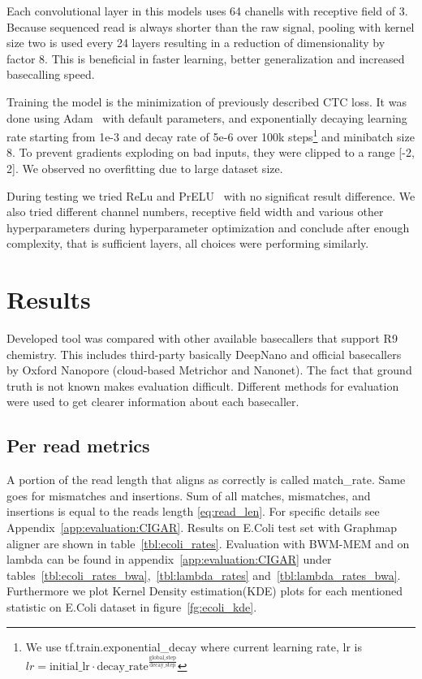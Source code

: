 \documentclass[runningheads,a4paper]{llncs}
\begin{document}
Each convolutional layer in this models uses 64 chanells with receptive field of 3. Because sequenced read is always shorter than the raw signal, pooling with kernel size two is used every 24 layers resulting in a reduction of dimensionality by factor 8. This is beneficial in faster learning, better generalization and increased basecalling speed.

Training the model is the minimization of previously described CTC loss. It was done using Adam~\cite{adam} with default parameters, and exponentially decaying learning rate starting from 1e-3 and decay rate of 5e-6 over 100k steps\footnote{We use tf.train.exponential\_decay where current learning rate, lr is $lr=\text{initial\_lr} \cdot \text{decay\_rate}^\frac{\text{global\_step}}{\text{decay\_step}}$} and minibatch size 8. To prevent gradients exploding on bad inputs, they were clipped to a range [-2, 2]. We observed no overfitting due to large dataset size.

During testing we tried ReLu and PrELU~\cite{prelu} with no significat result difference. We also tried different channel numbers, receptive field width and various other hyperparameters during hyperparameter optimization and conclude after enough complexity, that is sufficient layers, all choices were performing similarly.

\section{Results}

Developed tool was compared with other available basecallers that support R9 chemistry. This includes third-party basically DeepNano and official basecallers by Oxford Nanopore (cloud-based Metrichor and Nanonet).
The fact that ground truth is not known makes evaluation difficult.
Different methods for evaluation were used to get clearer information about each basecaller.

\subsection{Per read metrics}
\label{subs:read_metrics}
A portion of the read length that aligns as correctly is called match\_rate. Same goes for mismatches and insertions.
Sum of all matches, mismatches, and insertions is equal to the reads length \ref{eq:read_len}. For specific details see Appendix~\ref{app:evaluation:CIGAR}. Results on E.Coli test set with Graphmap aligner are shown in table~\ref{tbl:ecoli_rates}. Evaluation with BWM-MEM and on lambda can be found in appendix~\ref{app:evaluation:CIGAR} under tables~\ref{tbl:ecoli_rates_bwa},~\ref{tbl:lambda_rates} and~\ref{tbl:lambda_rates_bwa}. Furthermore we plot Kernel Density estimation(KDE) plots for each mentioned statistic on E.Coli dataset in figure~\ref{fg:ecoli_kde}.
\end{document}
